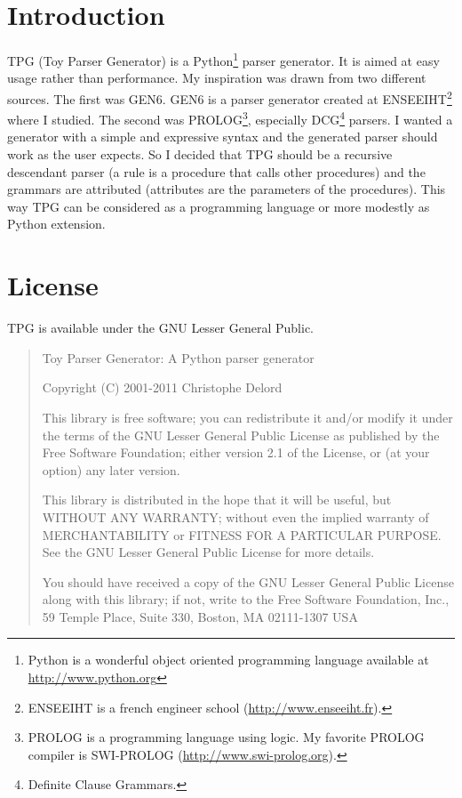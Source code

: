 \section{Introduction}

TPG (Toy Parser Generator) is a Python\footnote{Python is a wonderful object oriented programming language available at \url{http://www.python.org}} parser generator.
It is aimed at easy usage rather than performance.
My inspiration was drawn from two different sources.
The first was GEN6. GEN6 is a parser generator created at ENSEEIHT\footnote{ENSEEIHT is a french engineer school (\url{http://www.enseeiht.fr}).} where I studied.
The second was PROLOG\footnote{PROLOG is a programming language using logic. My favorite PROLOG compiler is SWI-PROLOG (\url{http://www.swi-prolog.org}).}, especially DCG\footnote{Definite Clause Grammars.} parsers.
I wanted a generator with a simple and expressive syntax and the generated parser should work as the user expects. So I decided that TPG should be a recursive descendant parser (a rule is a procedure that calls other procedures) and the grammars are attributed (attributes are the parameters of the procedures).
This way TPG can be considered as a programming language or more modestly as Python extension.

\section{License}

TPG is available under the GNU Lesser General Public.

\begin{quote}
Toy Parser Generator: A Python parser generator

Copyright (C) 2001-2011 Christophe Delord
 
This library is free software; you can redistribute it and/or
modify it under the terms of the GNU Lesser General Public
License as published by the Free Software Foundation; either
version 2.1 of the License, or (at your option) any later version.

This library is distributed in the hope that it will be useful,
but WITHOUT ANY WARRANTY; without even the implied warranty of
MERCHANTABILITY or FITNESS FOR A PARTICULAR PURPOSE.  See the GNU
Lesser General Public License for more details.

You should have received a copy of the GNU Lesser General Public
License along with this library; if not, write to the Free Software
Foundation, Inc., 59 Temple Place, Suite 330, Boston, MA  02111-1307  USA 
\end{quote}

